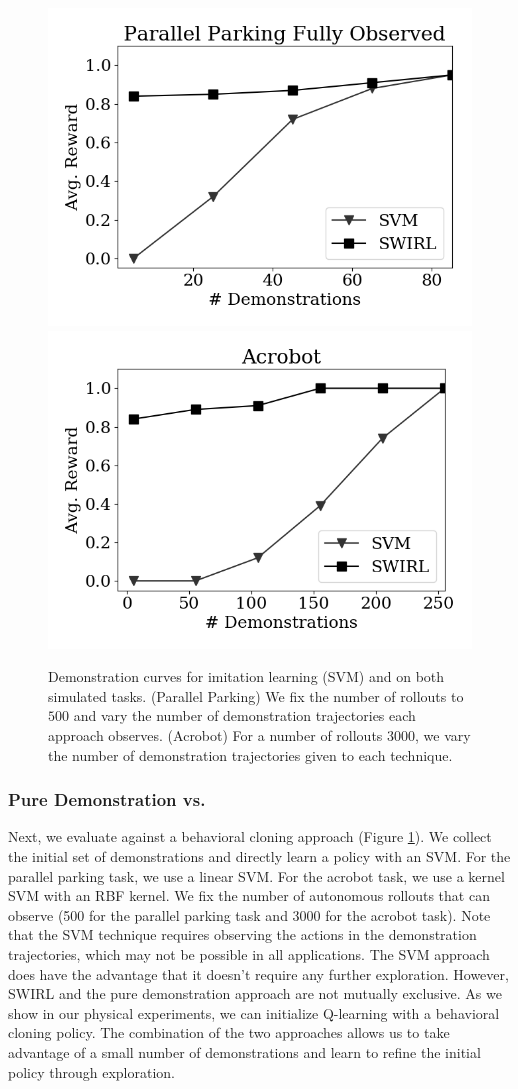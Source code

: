 \begin{figure}[t]
\centering
 \includegraphics[width=0.48\columnwidth]{swirl-experiments/ppfo-svm1.png}
 \includegraphics[width=0.48\columnwidth]{swirl-experiments/ppfo-svm2.png}
 \caption{Demonstration curves for imitation learning (SVM) and \hirl on both simulated tasks. (Parallel Parking) We fix the number of rollouts to $500$ and vary the number of demonstration trajectories each approach observes. (Acrobot) For a number of rollouts $3000$, we vary the number of demonstration trajectories given to each technique. \label{exp:pd}}
\end{figure}


\subsubsection{Pure Demonstration vs. \hirl}
Next, we evaluate \hirl against a behavioral cloning approach  (Figure \ref{exp:pd}). We collect the initial set of demonstrations and directly learn a policy with an SVM. For the parallel parking task, we use a linear SVM. For the acrobot task, we use a kernel SVM with an RBF kernel. We fix the number of autonomous rollouts that \hirl can observe (500 for the parallel parking task and 3000 for the acrobot task). Note that the SVM technique requires observing the actions in the demonstration trajectories, which may not be possible in all applications. The SVM approach does have the advantage that it doesn't require any further exploration.
However, SWIRL and the pure demonstration approach are not mutually exclusive. 
As we show in our physical experiments, we can initialize Q-learning with a behavioral cloning policy. 
The combination of the two approaches allows us to take advantage of a small number of demonstrations and learn to refine the initial policy through exploration.


